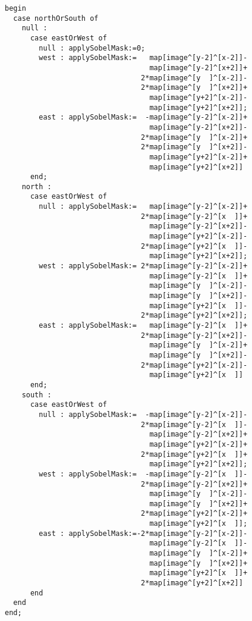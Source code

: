\begin{verbatim}
begin
  case northOrSouth of
    null :
      case eastOrWest of
        null : applySobelMask:=0;
        west : applySobelMask:=   map[image^[y-2]^[x-2]]-
                                  map[image^[y-2]^[x+2]]+
                                2*map[image^[y  ]^[x-2]]-
                                2*map[image^[y  ]^[x+2]]+
                                  map[image^[y+2]^[x-2]]-
                                  map[image^[y+2]^[x+2]];
        east : applySobelMask:=  -map[image^[y-2]^[x-2]]+
                                  map[image^[y-2]^[x+2]]-
                                2*map[image^[y  ]^[x-2]]+
                                2*map[image^[y  ]^[x+2]]-
                                  map[image^[y+2]^[x-2]]+
                                  map[image^[y+2]^[x+2]]
      end;
    north :
      case eastOrWest of
        null : applySobelMask:=   map[image^[y-2]^[x-2]]+
                                2*map[image^[y-2]^[x  ]]+
                                  map[image^[y-2]^[x+2]]-
                                  map[image^[y+2]^[x-2]]-
                                2*map[image^[y+2]^[x  ]]-
                                  map[image^[y+2]^[x+2]];
        west : applySobelMask:= 2*map[image^[y-2]^[x-2]]+
                                  map[image^[y-2]^[x  ]]+
                                  map[image^[y  ]^[x-2]]-
                                  map[image^[y  ]^[x+2]]-
                                  map[image^[y+2]^[x  ]]-
                                2*map[image^[y+2]^[x+2]];
        east : applySobelMask:=   map[image^[y-2]^[x  ]]+
                                2*map[image^[y-2]^[x+2]]-
                                  map[image^[y  ]^[x-2]]+
                                  map[image^[y  ]^[x+2]]-
                                2*map[image^[y+2]^[x-2]]-
                                  map[image^[y+2]^[x  ]]
      end;
    south :
      case eastOrWest of
        null : applySobelMask:=  -map[image^[y-2]^[x-2]]-
                                2*map[image^[y-2]^[x  ]]-
                                  map[image^[y-2]^[x+2]]+
                                  map[image^[y+2]^[x-2]]+
                                2*map[image^[y+2]^[x  ]]+
                                  map[image^[y+2]^[x+2]];
        west : applySobelMask:=  -map[image^[y-2]^[x  ]]-
                                2*map[image^[y-2]^[x+2]]+
                                  map[image^[y  ]^[x-2]]-
                                  map[image^[y  ]^[x+2]]+
                                2*map[image^[y+2]^[x-2]]+
                                  map[image^[y+2]^[x  ]];
        east : applySobelMask:=-2*map[image^[y-2]^[x-2]]-
                                  map[image^[y-2]^[x  ]]-
                                  map[image^[y  ]^[x-2]]+
                                  map[image^[y  ]^[x+2]]+
                                  map[image^[y+2]^[x  ]]+
                                2*map[image^[y+2]^[x+2]]
      end
  end
end;



\end{verbatim}
